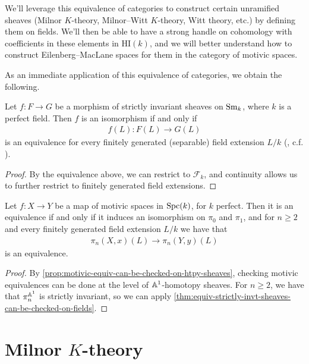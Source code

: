\documentclass[11pt,openany]{book}
\providecommand{\HI}{\mathrm{HI}}
\begin{document}
\begin{motivation} We'll leverage this equivalence of categories to construct certain unramified sheaves (Milnor $K$-theory, Milnor--Witt $K$-theory, Witt theory, etc.) by defining them on fields. We'll then be able to have a strong handle on cohomology with coefficients in these elements in $\HI(k)$, and we will better understand how to construct Eilenberg--MacLane spaces for them in the category of motivic spaces.
\end{motivation}

As an immediate application of this equivalence of categories, we obtain the following.

\begin{theorem}\label{thm:equiv-strictly-invt-sheaves-can-be-checked-on-fields} 
Let $f \colon F\to G$ be a morphism of strictly invariant sheaves on $\mathrm{Sm}_k$, where $k$ is a perfect field. Then $f$ is an isomorphism if and only if
\begin{align*}
    f(L) \colon F(L) \to G(L)
\end{align*}
is an equivalence for every finitely generated (separable) field extension $L/k$ (\cite[2.3,~2.8]{Morel}, c.f. \cite[2.7]{HMH}).
\end{theorem}
\begin{proof} By the equivalence above, we can restrict to $\mathcal{F}_k$, and continuity allows us to further restrict to finitely generated field extensions.
\end{proof}

\begin{corollary} Let $f \colon X \to Y$ be a map of motivic spaces in $\mathrm{Spc}(k)$, for $k$ perfect. Then it is an equivalence if and only if it induces an isomorphism on $\pi_0$ and $\pi_1$, and for $n\ge 2$ and every finitely generated field extension $L/k$ we have that
\begin{align*}
    \pi_n(X,x)(L) \to \pi_n(Y,y)(L)
\end{align*}
is an equivalence.
\end{corollary}
\begin{proof} By \autoref{prop:motivic-equiv-can-be-checked-on-htpy-sheaves}, checking motivic equivalences can be done at the level of $\mathbb{A}^1$-homotopy sheaves. For $n\ge2$, we have that $\pi_n^{\mathbb{A}^1}$ is strictly invariant, so we can apply \autoref{thm:equiv-strictly-invt-sheaves-can-be-checked-on-fields}.
\end{proof}



\section{Milnor \texorpdfstring{$K$}{K}-theory}
\end{document}
